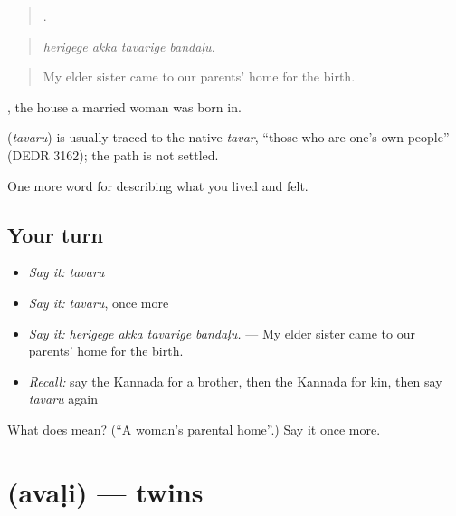 \begin{quote}
   .
\end{quote}

\begin{quote}
\emph{herigege akka tavarige bandaḷu.}
\end{quote}

\begin{quote}
My elder sister came to our parents' home for the birth.
\end{quote}

 , the house a married woman was born in.

\begin{cousinweb}
\textbf{} (\emph{tavaru}) is usually traced to the native \emph{tavar}, \textquotedblleft{}those who are one's own people\textquotedblright{} (DEDR 3162); the path is not settled.
\end{cousinweb}

\begin{grammarlens}[title={What you've built}]
One more word for describing what you lived and felt.
\end{grammarlens}

\subsection*{Your turn}
\begin{itemize}
\raggedright
  \item \emph{Say it:} \emph{tavaru}
  \item \emph{Say it:} \emph{tavaru}, once more
  \item \emph{Say it:} \emph{herigege akka tavarige bandaḷu.} — My elder sister came to our parents' home for the birth.
  \item \emph{Recall:} say the Kannada for a brother, then the Kannada for kin, then say \emph{tavaru} again
\end{itemize}

\begin{tcolorbox}[breakable,colback=teal!4,colframe=teal!35!black,title={Before you move on}]
What does  mean? (\textquotedblleft{}A woman's parental home\textquotedblright{}.) Say it once more.
\end{tcolorbox}
\section[\texorpdfstring{\kn{ಅವಳಿ} (avaḷi)}{ಅವಳಿ (avaḷi)}]{ (avaḷi) — twins}

